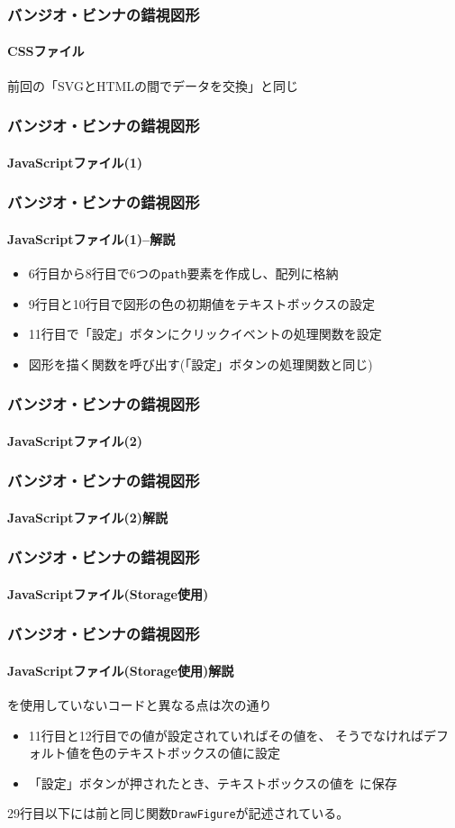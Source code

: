 \begin{frame}[containsverbatim]
 \frametitle{バンジオ・ビンナの錯視図形}
 \framesubtitle{CSSファイル}
 前回の「SVGとHTMLの間でデータを交換」と同じ
\end{frame}
\begin{frame}[containsverbatim]
 \frametitle{バンジオ・ビンナの錯視図形}
 \framesubtitle{JavaScriptファイル(1)}
\end{frame}
\begin{frame}[containsverbatim]
 \frametitle{バンジオ・ビンナの錯視図形}
 \framesubtitle{JavaScriptファイル(1)--解説}
 \begin{itemize}
  \item 6行目から8行目で6つの\texttt{path}要素を作成し、配列に格納
  \item 9行目と10行目で図形の色の初期値をテキストボックスの設定
  \item 11行目で「設定」ボタンにクリックイベントの処理関数を設定
  \item 図形を描く関数を呼び出す(「設定」ボタンの処理関数と同じ)
 \end{itemize}
\end{frame}
\begin{frame}[containsverbatim]
 \frametitle{バンジオ・ビンナの錯視図形}
 \framesubtitle{JavaScriptファイル(2)}
\end{frame}
\begin{frame}[containsverbatim]
 \frametitle{バンジオ・ビンナの錯視図形}
 \framesubtitle{JavaScriptファイル(2)解説}
\end{frame}
\begin{frame}[containsverbatim]
 \frametitle{バンジオ・ビンナの錯視図形}
 \framesubtitle{JavaScriptファイル(Storage使用)}
\end{frame}
\begin{frame}[containsverbatim]
 \frametitle{バンジオ・ビンナの錯視図形}
 \framesubtitle{JavaScriptファイル(Storage使用)解説}
 を使用していないコードと異なる点は次の通り
 \begin{itemize}
  \item 11行目と12行目での値が設定されていればその値を、
        そうでなければデフォルト値を色のテキストボックスの値に設定
  \item 「設定」ボタンが押されたとき、テキストボックスの値を
        に保存
 \end{itemize}
 29行目以下には前と同じ関数\texttt{DrawFigure}が記述されている。
\end{frame}
